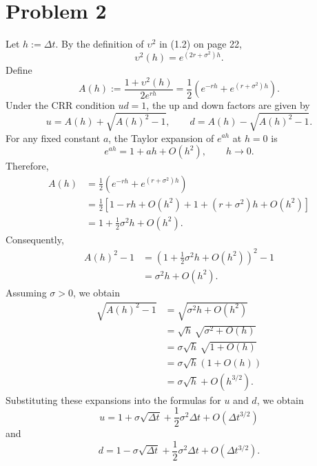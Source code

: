 \documentclass{article}
\begin{document}
\newpage
\section*{Problem 2}
Let \(h:=\Delta t\). By the definition of \(\upsilon^2\) in (1.2) on page 22,
\[
\upsilon^2(h)=e^{(2r+\sigma^2)h}.
\]
Define
\[
A(h)
:=
\frac{1+\upsilon^2(h)}{2e^{rh}}
=
\frac12\left(e^{-rh}+e^{(r+\sigma^2)h}\right).
\]
Under the CRR condition \(ud=1\), the up and down factors are given by
\[
u=A(h)+\sqrt{A(h)^2-1},
\qquad
d=A(h)-\sqrt{A(h)^2-1}.
\]
For any fixed constant \(a\), the Taylor expansion of \(e^{ah}\) at \(h=0\) is
\[
e^{ah}=1+ah+O(h^2),
\qquad h\to0.
\]
Therefore,
\[
\begin{aligned}
A(h)
&=
\frac12\left(e^{-rh}+e^{(r+\sigma^2)h}\right)\\
&=
\frac12\left[
1-rh+O(h^2)
+
1+(r+\sigma^2)h+O(h^2)
\right]\\
&=
1+\frac12\sigma^2h+O(h^2).
\end{aligned}
\]
Consequently,
\[
\begin{aligned}
A(h)^2-1
&=
\left(1+\frac12\sigma^2h+O(h^2)\right)^2-1\\
&=
\sigma^2h+O(h^2).
\end{aligned}
\]
Assuming \(\sigma>0\), we obtain
\[
\begin{aligned}
\sqrt{A(h)^2-1}
&=
\sqrt{\sigma^2h+O(h^2)}\\
&=
\sqrt{h}\,\sqrt{\sigma^2+O(h)}\\
&=
\sigma\sqrt{h}\,\sqrt{1+O(h)}\\
&=
\sigma\sqrt{h}\left(1+O(h)\right)\\
&=
\sigma\sqrt{h}+O(h^{3/2}).
\end{aligned}
\]
Substituting these expansions into the formulas for \(u\) and \(d\), we obtain
\[
\boxed{
u
=
1+\sigma\sqrt{\Delta t}
+\frac12\sigma^2\Delta t
+O\left(\Delta t^{3/2}\right)
}
\]
and
\[
\boxed{
d
=
1-\sigma\sqrt{\Delta t}
+\frac12\sigma^2\Delta t
+O\left(\Delta t^{3/2}\right).
}
\]

\newpage
\end{document}
